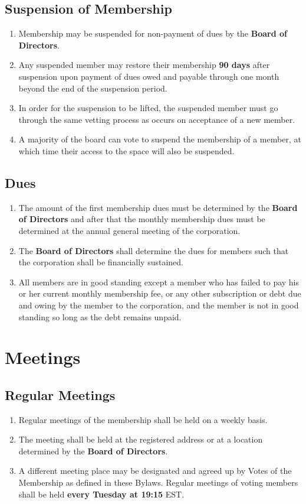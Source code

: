 \documentclass{article}
\begin{document}
\subsection{Suspension of Membership}
\begin{enumerate}
    \item Membership may be suspended for non-payment of dues by the \textbf{Board of Directors}.
    \item Any suspended member may restore their membership \textbf{90 days} after suspension upon payment of dues owed and payable through one month beyond the end of the suspension period.
    \item In order for the suspension to be lifted, the suspended member must go through the same vetting process as occurs on acceptance of a new member.
    \item A majority of the board can vote to suspend the membership of a member, at which time their access to the space will also be suspended.
\end{enumerate}
\subsection{Dues}
\begin{enumerate}
    \item The amount of the first membership dues must be determined by the \textbf{Board of Directors} and after that the monthly membership dues must be determined at the annual general meeting of the corporation.
    \item The \textbf{Board of Directors} shall determine the dues for members such that the corporation shall be financially sustained.
    \item All members are in good standing except a member who has failed to pay his or her current monthly membership fee, or any other subscription or debt due and owing by the member to the corporation, and the member is not in good standing so long as the debt remains unpaid.
\end{enumerate}
\section{Meetings}
\subsection{Regular Meetings}
\begin{enumerate}
    \item Regular meetings of the membership shall be held on a weekly basis.
    \item The meeting shall be held at the registered address or at a location determined by the \textbf{Board of Directors}.
    \item A different meeting place may be designated and agreed up by Votes of the Membership as defined in these Bylaws. Regular meetings of voting members shall be held \textbf{every Tuesday at 19:15} EST.
\end{enumerate}
\end{document}
